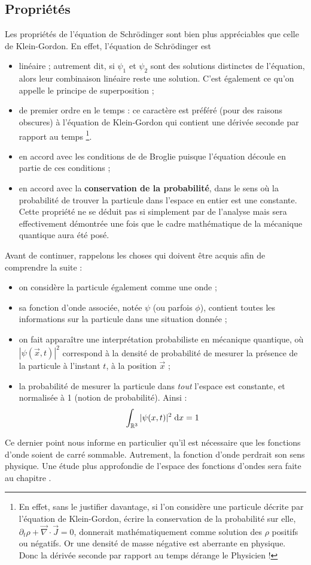 \subsection{Propriétés}
Les propriétés de l'équation de Schrödinger sont bien plus appréciables que celle de Klein-Gordon. En effet, l'équation de Schrödinger est
\begin{itemize}
\item linéaire ; autrement dit, si $\psi_1$ et $\psi_2$ sont des solutions distinctes de l'équation, alors leur combinaison linéaire reste une solution. C'est également ce qu'on appelle le principe de superposition ; 
\item de premier ordre en le temps : ce caractère est préféré (pour des raisons obscures) à l'équation de Klein-Gordon qui contient une dérivée seconde par rapport au temps \footnote{En effet, sans le justifier davantage, si l'on considère une particule décrite par l'équation de Klein-Gordon, écrire la conservation de la probabilité sur elle, $\partial_t \rho + \vec{\nabla} \cdot \vec{J} = 0$, donnerait mathématiquement comme solution des $\rho$ positifs ou négatifs. Or une densité de masse négative est aberrante en physique. Donc la dérivée seconde par rapport au temps dérange le Physicien !}.
\item en accord avec les conditions de de Broglie puisque l'équation découle en partie de ces conditions ;
\item en accord avec la \textbf{conservation de la probabilité}, dans le sens où la probabilité de trouver la particule dans l'espace en entier est une constante. Cette propriété ne se déduit pas si simplement par de l'analyse mais sera effectivement démontrée une fois que le cadre mathématique de la mécanique quantique aura été posé.
\end{itemize}
Avant de continuer, rappelons les choses qui doivent être acquis afin de comprendre la suite : 
\begin{itemize}[label= \textbullet]
  \item on considère la particule également comme une onde ; 
  \item sa fonction d'onde associée, notée $\psi$ (ou parfois $\phi$), contient toutes les informations sur la particule dans une situation donnée ; 
  \item on fait apparaître une interprétation probabiliste en mécanique quantique, où $|\psi(\vec{x},t)|^2$ correspond à la densité de probabilité de mesurer la présence de la particule à l'instant $t$, à la position $\vec{x}$ ; 
  \item la probabilité de mesurer la particule dans \textit{tout} l'espace est constante, et normalisée à 1 (notion de probabilité). Ainsi : 
  \begin{equation}
    \int_{\mathbb{R}^3} |\psi(x,t)|^2 \; \mathrm{d}x = 1
  \end{equation}
\end{itemize}
Ce dernier point nous informe en particulier qu'il est nécessaire que les fonctions d'onde soient de carré sommable. Autrement, la fonction d'onde perdrait son sens physique. 
Une étude plus approfondie de l'espace des fonctions d'ondes sera faite au chapitre .

